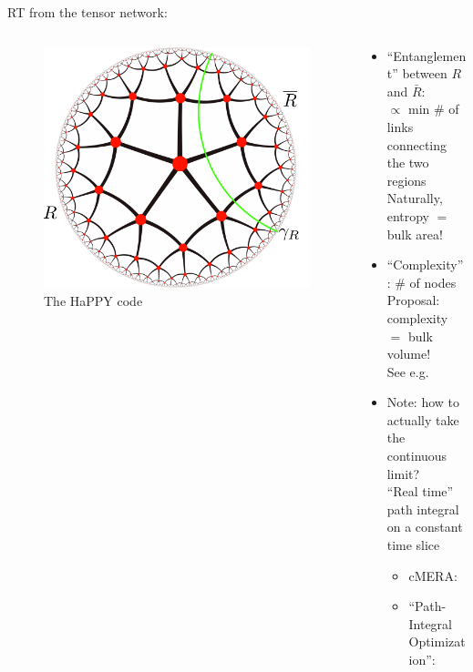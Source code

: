 \documentclass[aspectratio=169,10pt
	,noamsthm
]{beamer}
\begin{document}
\begin{frame}{RT from the tensor network}{\textcite{Harlow:2018fse}:\,}
	\begin{columns}
	\begin{column}{.35\textwidth}
		\begin{figure}[!h]
		\centering
		\includegraphics[height=.55\textheight]{img/cutnetwork.pdf}
		\caption{The HaPPY code \cite{Pastawski:2015qua,Harlow:2018fse}}
		\end{figure}
	\end{column}
	\begin{column}{.65\textwidth}
		\begin{itemize}
		\item ``Entanglement'' between $R$ and $\bar{R}$:\\
		$\propto$ min \# of links connecting the two regions\\
		Naturally, entropy $=$ bulk area!
	\pause
		\item ``Complexity'': \# of nodes\\
		Proposal: complexity $=$ bulk volume!\\
		{\footnotesize See e.g.~\textcite{Susskind:2014rva}}
	\pause
		\item Note: how to actually take the continuous limit?\\
		``Real time'' path integral on a constant time slice
			\begin{itemize}
			\item cMERA: \textcite{Nozaki:2012zj}
			\item ``Path-Integral Optimization'':\\
			\textcite{Boruch:2021hqs}
			\end{itemize}
		\end{itemize}
	\end{column}
	\end{columns}
\end{frame}
\end{document}
